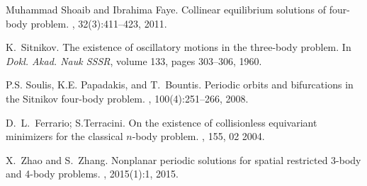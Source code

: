 \documentclass[smallcondensed]{svjour3}
\begin{document}
\begin{thebibliography}{10}
Muhammad Shoaib and Ibrahima Faye.
\newblock Collinear equilibrium solutions of four-body problem.
, 32(3):411--423, 2011.

K.~{S}itnikov.
\newblock The existence of oscillatory motions in the three-body problem.
\newblock In {\em Dokl. Akad. Nauk SSSR}, volume 133, pages 303--306, 1960.

P.S. Soulis, K.E. Papadakis, and T.~Bountis.
\newblock Periodic orbits and bifurcations in the {S}itnikov four-body problem.
, 100(4):251--266,
  2008.

D.~L.~Ferrario; S.Terracini.
\newblock On the existence of collisionless equivariant minimizers for the
  classical $n$-body problem.
, 155, 02 2004.

X.~Zhao and S.~Zhang.
\newblock Nonplanar periodic solutions for spatial restricted 3-body and 4-body
  problems.
, 2015(1):1, 2015.

\end{thebibliography}
\end{document}
